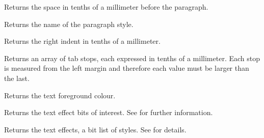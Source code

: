 \label{wxrichtextattrgetparagraphspacingbefore}


Returns the space in tenths of a millimeter before the paragraph.

\label{wxrichtextattrgetparagraphstylename}


Returns the name of the paragraph style.

\label{wxrichtextattrgetrightindent}


Returns the right indent in tenths of a millimeter.

\label{wxrichtextattrgettabs}


Returns an array of tab stops, each expressed in tenths of a millimeter. Each stop
is measured from the left margin and therefore each value must be larger than the last.

\label{wxrichtextattrgettextcolour}


Returns the text foreground colour.

\label{wxrichtextattrgettexteffectflags}


Returns the text effect bits of interest. See  for further information.

\label{wxrichtextattrgettexteffects}


Returns the text effects, a bit list of styles. See  for
details.

\label{wxrichtextattrgeturl}


